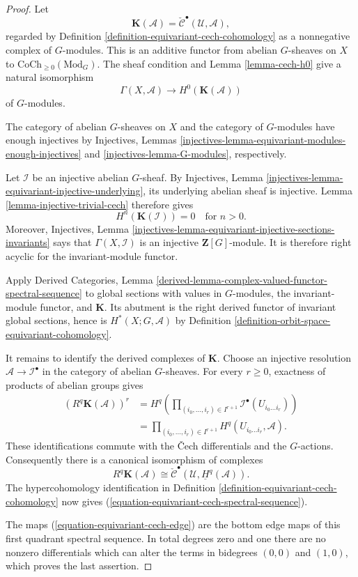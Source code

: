 \begin{proof}
Let
$$
\mathbf K(\mathcal{A})
=\check{\mathcal{C}}^\bullet(\mathcal{U},\mathcal{A}),
$$
regarded by Definition
\ref{definition-equivariant-cech-cohomology} as a nonnegative complex of
$G$-modules. This is an additive functor from abelian $G$-sheaves on $X$
to $\text{CoCh}_{\geq 0}(\text{Mod}_G)$. The sheaf condition and Lemma
\ref{lemma-cech-h0} give a natural isomorphism
$$
\Gamma(X,\mathcal{A})\longrightarrow H^0(\mathbf K(\mathcal{A}))
$$
of $G$-modules.

The category of abelian $G$-sheaves on $X$ and the category of
$G$-modules have enough injectives by Injectives, Lemmas
\ref{injectives-lemma-equivariant-modules-enough-injectives} and
\ref{injectives-lemma-G-modules}, respectively.

Let $\mathcal{I}$ be an injective abelian $G$-sheaf. By Injectives,
Lemma \ref{injectives-lemma-equivariant-injective-underlying}, its
underlying abelian sheaf is injective. Lemma
\ref{lemma-injective-trivial-cech} therefore gives
$$
H^n(\mathbf K(\mathcal{I}))=0\quad\text{for }n>0.
$$
Moreover, Injectives, Lemma
\ref{injectives-lemma-equivariant-injective-sections-invariants} says
that $\Gamma(X,\mathcal{I})$ is an injective $\mathbf Z[G]$-module. It is
therefore right acyclic for the invariant-module functor.

Apply Derived Categories, Lemma
\ref{derived-lemma-complex-valued-functor-spectral-sequence} to global
sections with values in $G$-modules, the invariant-module functor, and
$\mathbf K$. Its abutment is the right derived functor of invariant global
sections, hence is $H^*(X;G,\mathcal{A})$ by Definition
\ref{definition-orbit-space-equivariant-cohomology}.

It remains to identify the derived complexes of $\mathbf K$. Choose an
injective resolution $\mathcal{A}\to\mathcal{I}^\bullet$ in the category
of abelian $G$-sheaves. For every $r\geq 0$, exactness of products of
abelian groups gives
$$
\begin{aligned}
(R^q\mathbf K(\mathcal{A}))^r
&=H^q\left(
\prod_{(i_0,\ldots,i_r)\in I^{r+1}}
\mathcal{I}^\bullet(U_{i_0\ldots i_r})\right)\\
&=\prod_{(i_0,\ldots,i_r)\in I^{r+1}}
H^q(U_{i_0\ldots i_r},\mathcal{A}).
\end{aligned}
$$
These identifications commute with the \v Cech differentials and the
$G$-actions. Consequently there is a canonical isomorphism of complexes
$$
R^q\mathbf K(\mathcal{A})
\cong
\check{\mathcal{C}}^\bullet(
\mathcal{U},\underline H^q(\mathcal{A})).
$$
The hypercohomology identification in Definition
\ref{definition-equivariant-cech-cohomology} now gives
(\ref{equation-equivariant-cech-spectral-sequence}).

The maps (\ref{equation-equivariant-cech-edge}) are the bottom edge maps
of this first quadrant spectral sequence. In total degrees zero and one
there are no nonzero differentials which can alter the terms in bidegrees
$(0,0)$ and $(1,0)$, which proves the last assertion.
\end{proof}

